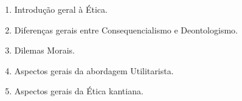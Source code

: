 \documentclass[
	article,			%
	12pt,				%
	twoside,			%
	a4paper,			%
	english,			%
	brazil,				%
	sumario=tradicional
]{plano}
\begin{document}
\begin{enumerate}





		\item Introdução geral à Ética.
		\item Diferenças gerais entre Consequencialismo e Deontologismo.
		\item Dilemas Morais.
		\item Aspectos gerais da abordagem Utilitarista.
		\item Aspectos gerais da Ética kantiana.





\end{enumerate}
\end{document}
